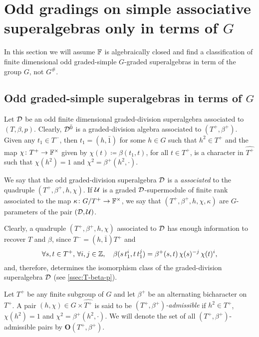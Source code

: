 \section{Odd gradings on simple associative superalgebras only in terms of \texorpdfstring{$G$}{G}}\label{sec:assc-only-G}

In this section we will assume $\mathbb{F}$ is algebraically closed and find a classification of finite dimensional odd graded-simple $G$-graded superalgebras in term of the group $G$, not $G^\#$.

\subsection{Odd graded-simple superalgebras in terms of \texorpdfstring{$G$}{G}}\label{ssec:odd-div-G-only}

Let $\mathcal{D}$ be an odd finite dimensional graded-division superalgebra associated to $(T, \beta, p)$. 
Clearly, $\mathcal{D}^{\bar0}$ is a graded-division algebra associated to $(T^+, \beta^+)$. 
Given any $t_1 \in T^-$, then $t_1 = (h, \bar 1)$ for some $h\in G$ such that $h^2\in T^+$ and the map $\chi \colon T^+ \to \mathbb{F}^\times$ given by $\chi(t) \coloneqq \beta(t_1, t)$, for all $t\in T^+$, is a character in $\widehat{T^+}$ such that $\chi(h^2) = 1$ and $\chi^2 = \beta^+ (h^2, \cdot)$. 

\begin{defi}\label{def:odd-parameters}
    We say that the odd graded-division superalgebra $\mathcal{D}$ is a \emph{associated} to the quadruple $(T^+, \beta^+, h,\chi)$. 
    If $\mathcal U$ is a graded $\mathcal{D}$-supermodule of finite rank associated to the map $\kappa\colon G/T^+ \to \mathbb{F}^\times$, we say that $(T^+, \beta^+, h, \chi, \kappa)$ are $G$-parameters of the pair $(\mathcal{D}, \mathcal U)$. 
\end{defi}

Clearly, a quadruple $(T^+, \beta^+, h,\chi)$ associated to $\mathcal{D}$ has enough information to recover $T$ and $\beta$, since $T^- = (h, \bar 1) T^+$ and
\[\label{eq:beta-from-h-chi}
    \forall s,t\in T^+,\, \forall i,j \in \mathbb{Z}, \quad \beta(s\, t_1^i,t \, t_1^j) = \beta^+(s,t)\, \chi (s)^{-j}\, \chi (t)^i,
\]
and, therefore, determines the isomorphism class of the graded-division superalgebra $\mathcal{D}$ (see \cref{ssec:T-beta-p}). 

\begin{defi}\label{def:O(T+-beta+)}
    Let $T^+$ be any finite subgroup of $G$ and let $\beta^+$ be an alternating bicharacter on $T^+$. 
    A pair $(h,\chi) \in G \times \widehat{T^+}$ is said to be \emph{$(T^+, \beta^+)$-admissible} if 
    $h^2 \in T^+$, $\chi(h^2) = 1$ and $\chi^2 = \beta^+(h^2, \cdot)$. 
    We will denote the set of all $(T^+, \beta^+)$-admissible pairs by $\mathbf {O} (T^+, \beta^+)$. 
\end{defi}

